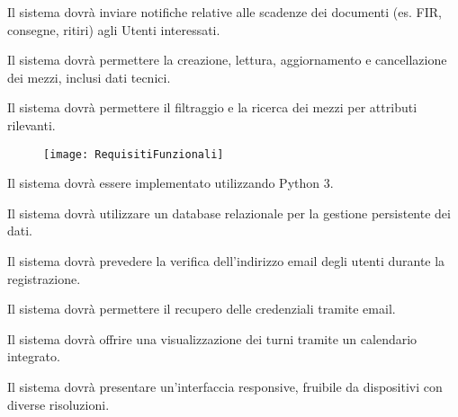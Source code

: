 \documentclass[a4paper]{report}
\begin{document}
Il sistema dovrà inviare notifiche relative alle scadenze dei documenti (es. FIR, consegne, ritiri) agli Utenti interessati.



Il sistema dovrà permettere la creazione, lettura, aggiornamento e cancellazione dei mezzi, inclusi dati tecnici.


Il sistema dovrà permettere il filtraggio e la ricerca dei mezzi per attributi rilevanti.

\begin{figure}[H]
    \centering
    \texttt{[image: RequisitiFunzionali]}
\end{figure}
\clearpage





Il sistema dovrà essere implementato utilizzando Python 3.


Il sistema dovrà utilizzare un database relazionale per la gestione persistente dei dati.


Il sistema dovrà prevedere la verifica dell'indirizzo email degli utenti durante la registrazione.


Il sistema dovrà permettere il recupero delle credenziali tramite email.



Il sistema dovrà offrire una visualizzazione dei turni tramite un calendario integrato.


Il sistema dovrà presentare un'interfaccia responsive, fruibile da dispositivi con diverse risoluzioni.

\end{document}
